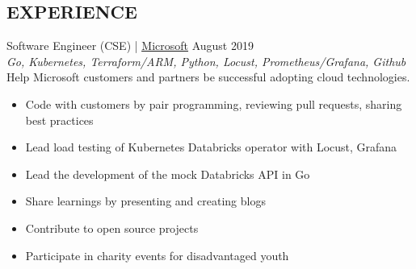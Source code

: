 \documentclass[margin, 10pt, hidelinks]{res} %
\newcommand{\emphasize}{\large} %
\begin{document}
\begin{resume}






\section{EXPERIENCE}

{\emphasize Software Engineer (CSE)} | \href{https://www.microsoft.com/}{\underline{Microsoft}}    \hfill August 2019  \\
{\it Go, Kubernetes, Terraform/ARM, Python, Locust, Prometheus/Grafana, Github} \\ %
Help Microsoft customers and partners be successful adopting cloud technologies.
\begin{itemize} \setlength{\itemindent}{-0.1in}\itemsep 0pt %
\item Code with customers by pair programming, reviewing pull requests, sharing best practices
\item Lead load testing of Kubernetes Databricks operator with Locust, Grafana
\item Lead the development of the mock Databricks API in Go
\item Share learnings by presenting and creating blogs
\item Contribute to open source projects
\item Participate in charity events for disadvantaged youth
\end{itemize}



\end{resume}
\end{document}
